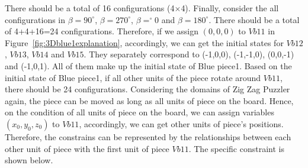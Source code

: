 There should be a total of 16 configurations (4$\times$4). Finally, consider the all configurations in $\beta=90^{\circ}$, $\beta=270^{\circ}$, $\beta=^{\circ}0$ and $\beta=180^{\circ}$. There should be a total of 4+4+16=24 configurations.
Therefore, if we assign $(0,0,0)$ to $Vb11$ in Figure~\ref{fig:3Dblue1explanation}, accordingly, we can get the initial states for $Vb12$, $Vb13$, $Vb14$ and $Vb15$. They separately correspond to (-1,0,0), (-1,-1,0), (0,0,-1) and (-1,0,1). 
All of them make up the initial state of Blue piece1. Based on the initial state of Blue piece1, if all other units of the piece rotate around $Vb11$, there should be 24 configurations. Considering the domains of Zig Zag Puzzler again, the piece can be moved as long as all units of piece on the board. Hence, on the condition of all units of piece on the board, we can assign variables $(x_{0},y_{0},z_{0})$ to $Vb11$, accordingly, we can get other units of piece's positions. Therefore, the constrains can be represented by the relationships between each other unit of piece with the first unit of piece $Vb11$. The specific constraint is shown below.
